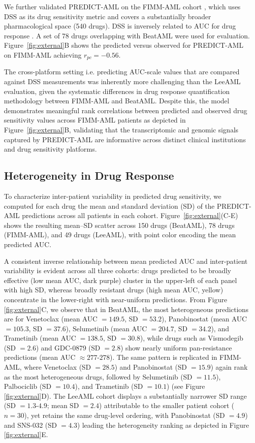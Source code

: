 \documentclass[pdflatex,sn-mathphys-num]{sn-jnl}
\theoremstyle{thmstyleone}
\theoremstyle{thmstyletwo}
\theoremstyle{thmstylethree}
\begin{document}
We further validated PREDICT-AML on the FIMM-AML cohort \cite{malani2022implementing}, which uses DSS as its drug sensitivity metric and covers a substantially broader pharmacological space (540 drugs). DSS is inversely related to AUC for drug response \cite{malani2022implementing}. A set of 78 drugs overlapping with BeatAML were used for evaluation. Figure~\ref{fig:external}B shows the predicted versus observed for PREDICT-AML on FIMM-AML achieving $r_{pc}=-0.56$.

The cross-platform setting i.e. predicting AUC-scale values that are compared against DSS measurements was inherently more challenging than the LeeAML evaluation, given the systematic differences in drug response quantification methodology between FIMM-AML and BeatAML. Despite this, the model demonstrates meaningful rank correlations between predicted and observed drug sensitivity values across FIMM-AML patients as depicted in Figure~\ref{fig:external}B, validating that the transcriptomic and genomic signals captured by PREDICT-AML are informative across distinct clinical institutions and drug sensitivity platforms. 
\subsection{Heterogeneity in Drug Response}\label{sec3.7}
To characterize inter-patient variability in predicted drug sensitivity, we computed for each drug the mean and standard deviation (SD) of the PREDICT-AML predictions across all patients in each cohort. Figure~\ref{fig:external}(C-E) shows the resulting mean–SD scatter across 150 drugs (BeatAML), 78 drugs (FIMM-AML), and 49 drugs (LeeAML), with point color encoding the mean predicted AUC.

A consistent inverse relationship between mean predicted AUC and inter-patient variability is evident across all three cohorts: drugs predicted to be broadly effective (low mean AUC, dark purple) cluster in the upper-left of each panel with high SD, whereas broadly resistant drugs (high mean AUC, yellow) concentrate in the lower-right with near-uniform predictions. From Figure \ref{fig:external}C, we observe that in BeatAML, the most heterogeneous predictions are for Venetoclax (mean AUC $= 149.5$, SD $= 53.2$), Panobinostat (mean AUC $= 105.3$, SD $= 37.6$), Selumetinib (mean AUC $= 204.7$, SD $= 34.2$), and Trametinib (mean AUC $= 138.5$, SD $= 30.8$), while drugs such as Vismodegib (SD $= 2.6$) and GDC-0879 (SD $= 2.8$) show nearly uniform pan-resistance predictions (mean AUC $\approx 277$-$278$). The same pattern is replicated in FIMM-AML, where Venetoclax (SD $= 28.5$) and Panobinostat (SD $= 15.9$) again rank as the most heterogeneous drugs, followed by Selumetinib (SD $= 11.5$), Palbociclib (SD $= 10.4$), and Trametinib (SD $= 10.1$) (see Figure \ref{fig:external}D). The LeeAML cohort displays a substantially narrower SD range (SD $= 1.3$-$4.9$; mean SD $= 2.4$) attributable to the smaller patient cohort ($n = 30$), yet retains the same drug-level ordering, with Panobinostat (SD $= 4.9$) and SNS-032 (SD $= 4.3$) leading the heterogeneity ranking as depicted in Figure \ref{fig:external}E. 
\end{document}
